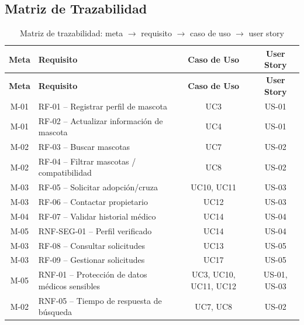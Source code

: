 \documentclass[journal,onecolumn]{IEEEtran}
\begin{document}
\subsection{Matriz de Trazabilidad}

\begin{longtable}{|c|p{7cm}|c|c|}
	\caption{Matriz de trazabilidad: meta $\rightarrow$ requisito $\rightarrow$ caso de uso $\rightarrow$ user story}
	\label{tab:trazabilidad}\\
	
	\hline
	\textbf{Meta} & \textbf{Requisito} & \textbf{Caso de Uso} & \textbf{User Story} \\
	\hline
	\endfirsthead
	
	\hline
	\textbf{Meta} & \textbf{Requisito} & \textbf{Caso de Uso} & \textbf{User Story} \\
	\hline
	\endhead
	
	M-01 & RF-01 -- Registrar perfil de mascota & UC3 & US-01 \\
	\hline
	
	M-01 & RF-02 -- Actualizar información de mascota & UC4 & US-01 \\
	\hline
	
	M-02 & RF-03 -- Buscar mascotas & UC7 & US-02 \\
	\hline
	
	M-02 & RF-04 -- Filtrar mascotas / compatibilidad & UC8 & US-02 \\
	\hline
	
	M-03 & RF-05 -- Solicitar adopción/cruza & UC10, UC11 & US-03 \\
	\hline
	
	M-03 & RF-06 -- Contactar propietario & UC12 & US-03 \\
	\hline
	
	M-04 & RF-07 -- Validar historial médico & UC14 & US-04 \\
	\hline
	
	M-05 & RNF-SEG-01 -- Perfil verificado & UC14 & US-04 \\
	\hline
	
	M-03 & RF-08 -- Consultar solicitudes & UC13 & US-05 \\
	\hline
	
	M-03 & RF-09 -- Gestionar solicitudes & UC17 & US-05 \\
	\hline
	
	M-05 & RNF-01 -- Protección de datos médicos sensibles & UC3, UC10, UC11, UC12 & US-01, US-03 \\
	\hline
	
	M-02 & RNF-05 -- Tiempo de respuesta de búsqueda & UC7, UC8 & US-02 \\
	\hline
	
\end{longtable}
\end{document}
